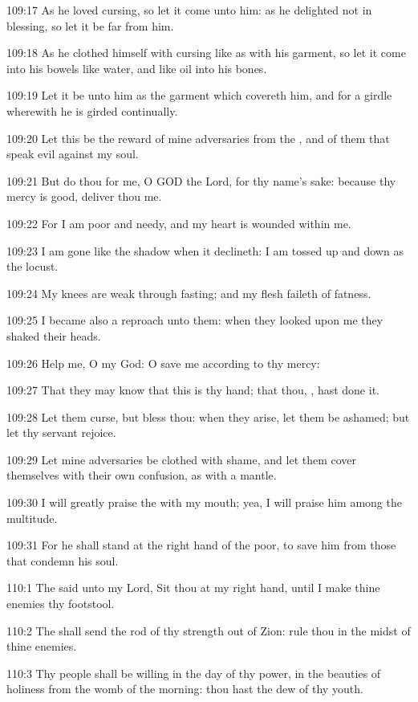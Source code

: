 109:17 As he loved cursing, so let it come unto him: as he delighted
not in blessing, so let it be far from him.

109:18 As he clothed himself with cursing like as with his garment, so
let it come into his bowels like water, and like oil into his bones.

109:19 Let it be unto him as the garment which covereth him, and for a
girdle wherewith he is girded continually.

109:20 Let this be the reward of mine adversaries from the \LORD, and
of them that speak evil against my soul.

109:21 But do thou for me, O GOD the Lord, for thy name's sake:
because thy mercy is good, deliver thou me.

109:22 For I am poor and needy, and my heart is wounded within me.

109:23 I am gone like the shadow when it declineth: I am tossed up and
down as the locust.

109:24 My knees are weak through fasting; and my flesh faileth of
fatness.

109:25 I became also a reproach unto them: when they looked upon me
they shaked their heads.

109:26 Help me, O \LORD my God: O save me according to thy mercy:

109:27 That they may know that this is thy hand; that thou, \LORD, hast
done it.

109:28 Let them curse, but bless thou: when they arise, let them be
ashamed; but let thy servant rejoice.

109:29 Let mine adversaries be clothed with shame, and let them cover
themselves with their own confusion, as with a mantle.

109:30 I will greatly praise the \LORD with my mouth; yea, I will
praise him among the multitude.

109:31 For he shall stand at the right hand of the poor, to save him
from those that condemn his soul.



110:1 The \LORD said unto my Lord, Sit thou at my right hand, until I
make thine enemies thy footstool.

110:2 The \LORD shall send the rod of thy strength out of Zion: rule
thou in the midst of thine enemies.

110:3 Thy people shall be willing in the day of thy power, in the
beauties of holiness from the womb of the morning: thou hast the dew
of thy youth.

